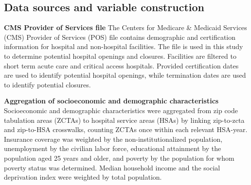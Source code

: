\subsection*{Data sources and variable construction}
\textbf{CMS Provider of Services file} \newline
The Centers for Medicare \& Medicaid Services (CMS) Provider of Services (POS) file contains demographic and certification information for hospital and non-hospital facilities. The file is used in this study to determine potential hospital openings and closures. Facilities are filtered to short term acute care and critical access hospitals. Provided certification dates are used to identify potential hospital openings, while termination dates are used to identify potential closures. \newline

\noindent \textbf{Aggregation of socioeconomic and demographic characteristics} \newline
Socioeconomic and demographic characteristics were aggregated from zip code tabulation areas (ZCTAs) to hospital service areas (HSAs) by linking zip-to-zcta and zip-to-HSA crosswalks, counting ZCTAs once within each relevant HSA-year. Insurance coverage was weighted by the non-institutionalized population, unemployment by the civilian labor force, educational attainment by the population aged 25 years and older, and poverty by the population for whom poverty status was determined. Median household income and the social deprivation index were weighted by total population.

